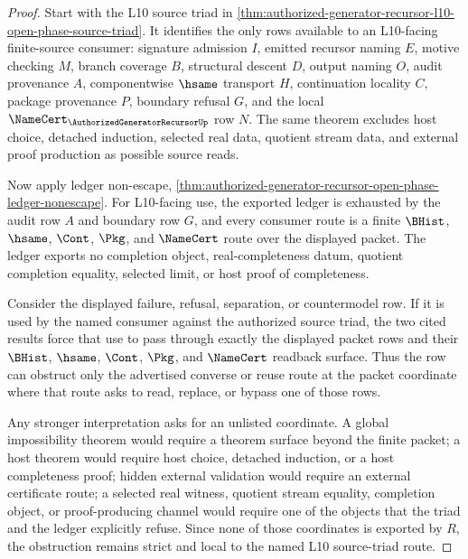 \begin{proof}
Start with the L10 source triad in \autoref{thm:authorized-generator-recursor-l10-open-phase-source-triad}. It identifies the only rows available to an L10-facing finite-source consumer: signature admission $I$, emitted recursor naming $E$, motive checking $M$, branch coverage $B$, structural descent $D$, output naming $O$, audit provenance $A$, componentwise $\hsame$ transport $H$, continuation locality $C$, package provenance $P$, boundary refusal $G$, and the local $\NameCert_{\AuthorizedGeneratorRecursorUp}$ row $N$. The same theorem excludes host choice, detached induction, selected real data, quotient stream data, and external proof production as possible source reads.

Now apply ledger non-escape, \autoref{thm:authorized-generator-recursor-open-phase-ledger-nonescape}. For L10-facing use, the exported ledger is exhausted by the audit row $A$ and boundary row $G$, and every consumer route is a finite $\BHist$, $\hsame$, $\Cont$, $\Pkg$, and $\NameCert$ route over the displayed packet. The ledger exports no completion object, real-completeness datum, quotient completion equality, selected limit, or host proof of completeness.

Consider the displayed failure, refusal, separation, or countermodel row. If it is used by the named consumer against the authorized source triad, the two cited results force that use to pass through exactly the displayed packet rows and their $\BHist$, $\hsame$, $\Cont$, $\Pkg$, and $\NameCert$ readback surface. Thus the row can obstruct only the advertised converse or reuse route at the packet coordinate where that route asks to read, replace, or bypass one of those rows.

Any stronger interpretation asks for an unlisted coordinate. A global impossibility theorem would require a theorem surface beyond the finite packet; a host theorem would require host choice, detached induction, or a host completeness proof; hidden external validation would require an external certificate route; a selected real witness, quotient stream equality, completion object, or proof-producing channel would require one of the objects that the triad and the ledger explicitly refuse. Since none of those coordinates is exported by $R$, the obstruction remains strict and local to the named L10 source-triad route.
\end{proof}
